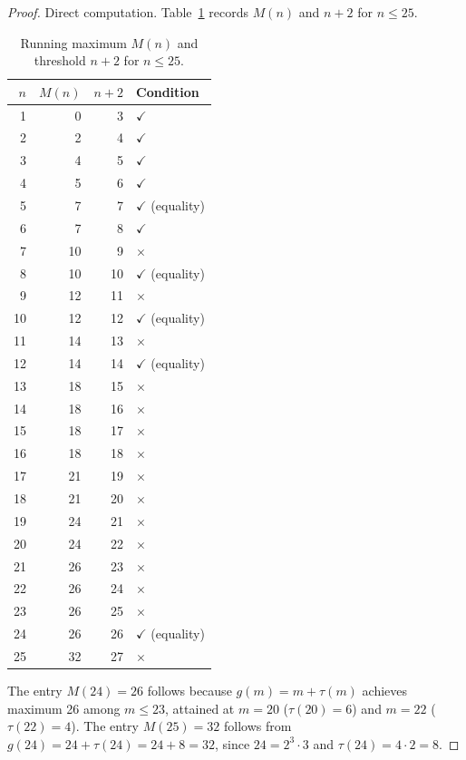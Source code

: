 \documentclass[12pt]{article}
\theoremstyle{plain}
\theoremstyle{definition}
\begin{document}
\begin{proof}
Direct computation.  Table~\ref{tab:small} records $M(n)$ and $n+2$ for $n \leq 25$.

\begin{table}[h]
\centering
\begin{tabular}{rrrl}
\toprule
$n$ & $M(n)$ & $n+2$ & Condition \\
\midrule
1  & 0  & 3  & $\checkmark$ \\
2  & 2  & 4  & $\checkmark$ \\
3  & 4  & 5  & $\checkmark$ \\
4  & 5  & 6  & $\checkmark$ \\
5  & 7  & 7  & $\checkmark$ (equality) \\
6  & 7  & 8  & $\checkmark$ \\
7  & 10 & 9  & $\times$ \\
8  & 10 & 10 & $\checkmark$ (equality) \\
9  & 12 & 11 & $\times$ \\
10 & 12 & 12 & $\checkmark$ (equality) \\
11 & 14 & 13 & $\times$ \\
12 & 14 & 14 & $\checkmark$ (equality) \\
13 & 18 & 15 & $\times$ \\
14 & 18 & 16 & $\times$ \\
15 & 18 & 17 & $\times$ \\
16 & 18 & 18 & $\times$ \\
17 & 21 & 19 & $\times$ \\
18 & 21 & 20 & $\times$ \\
19 & 24 & 21 & $\times$ \\
20 & 24 & 22 & $\times$ \\
21 & 26 & 23 & $\times$ \\
22 & 26 & 24 & $\times$ \\
23 & 26 & 25 & $\times$ \\
24 & 26 & 26 & $\checkmark$ (equality) \\
25 & 32 & 27 & $\times$ \\
\bottomrule
\end{tabular}
\caption{Running maximum $M(n)$ and threshold $n+2$ for $n \leq 25$.}
\label{tab:small}
\end{table}

The entry $M(24) = 26$ follows because $g(m) = m + \tau(m)$ achieves maximum 26 among
$m \leq 23$, attained at $m = 20$ ($\tau(20) = 6$) and $m = 22$ ($\tau(22) = 4$).
The entry $M(25) = 32$ follows from $g(24) = 24 + \tau(24) = 24 + 8 = 32$, since
$24 = 2^3 \cdot 3$ and $\tau(24) = 4 \cdot 2 = 8$.
\end{proof}
\end{document}
